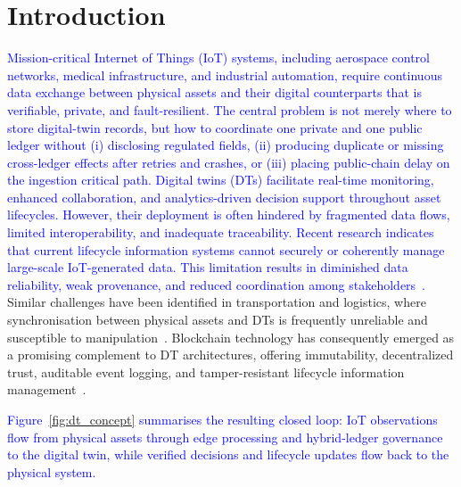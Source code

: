 \documentclass[final,5p,times,twocolumn]{elsarticle}
\begin{document}



\section{\textbf{Introduction}}
\label{int}
\textcolor{blue}{Mission-critical Internet of Things (IoT) systems, including aerospace control networks,
medical infrastructure, and industrial automation, require continuous data exchange between
physical assets and their digital counterparts that is verifiable, private, and
fault-resilient. The central problem is not merely where to store digital-twin records, but how to coordinate one private and one public ledger without (i) disclosing regulated fields, (ii) producing duplicate or missing cross-ledger effects after retries and crashes, or (iii) placing public-chain delay on the ingestion critical path. Digital twins (DTs) facilitate real-time monitoring, enhanced
collaboration, and analytics-driven decision support throughout asset lifecycles. However, their
deployment is often hindered by fragmented data flows, limited interoperability, and
inadequate traceability. Recent research indicates that current lifecycle information systems
cannot securely or coherently manage large-scale IoT-generated data. This limitation results in
diminished data reliability, weak provenance, and reduced coordination among
stakeholders~\cite{sadri2023integration}.}
Similar challenges have been identified in transportation and logistics, where
synchronisation between physical assets and DTs is frequently unreliable and susceptible to
manipulation~\cite{cunat2024blockchain}.
Blockchain technology has consequently emerged as a promising complement to DT architectures,
offering immutability, decentralized trust, auditable event logging, and tamper-resistant
lifecycle information management~\cite{kanu2024blockchain}.

\textcolor{blue}{Figure~\ref{fig:dt_concept} summarises the resulting closed loop: IoT observations
flow from physical assets through edge processing and hybrid-ledger governance to the digital
twin, while verified decisions and lifecycle updates flow back to the physical system.}
\end{document}
